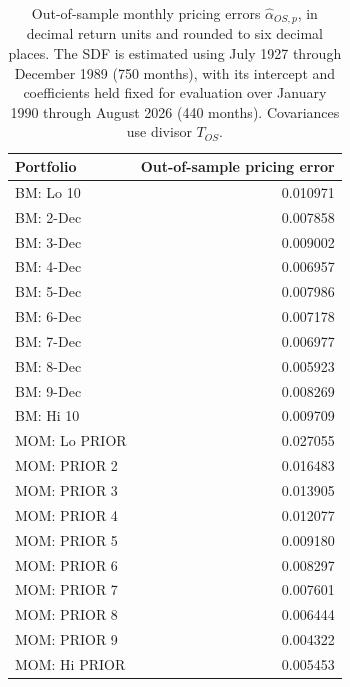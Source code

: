 \begin{table}[!htbp]
  \centering
  \caption{Out-of-sample monthly pricing errors $\hat\alpha_{OS,p}$,
  in decimal return units and rounded to six decimal places. The SDF
  is estimated using July 1927 through December 1989 (750 months),
  with its intercept and coefficients held fixed for evaluation over
  January 1990 through August 2026 (440 months).
  Covariances use divisor $T_{OS}$.}
  \label{tab:q2e-out-of-sample-pricing-errors}
  \small
  \begin{tabular}{lr}
    \toprule
    Portfolio & Out-of-sample pricing error \\
    \midrule
    BM: Lo 10 & 0.010971 \\
    BM: 2-Dec & 0.007858 \\
    BM: 3-Dec & 0.009002 \\
    BM: 4-Dec & 0.006957 \\
    BM: 5-Dec & 0.007986 \\
    BM: 6-Dec & 0.007178 \\
    BM: 7-Dec & 0.006977 \\
    BM: 8-Dec & 0.005923 \\
    BM: 9-Dec & 0.008269 \\
    BM: Hi 10 & 0.009709 \\
    \midrule
    MOM: Lo PRIOR & 0.027055 \\
    MOM: PRIOR 2 & 0.016483 \\
    MOM: PRIOR 3 & 0.013905 \\
    MOM: PRIOR 4 & 0.012077 \\
    MOM: PRIOR 5 & 0.009180 \\
    MOM: PRIOR 6 & 0.008297 \\
    MOM: PRIOR 7 & 0.007601 \\
    MOM: PRIOR 8 & 0.006444 \\
    MOM: PRIOR 9 & 0.004322 \\
    MOM: Hi PRIOR & 0.005453 \\
    \bottomrule
  \end{tabular}
\end{table}
